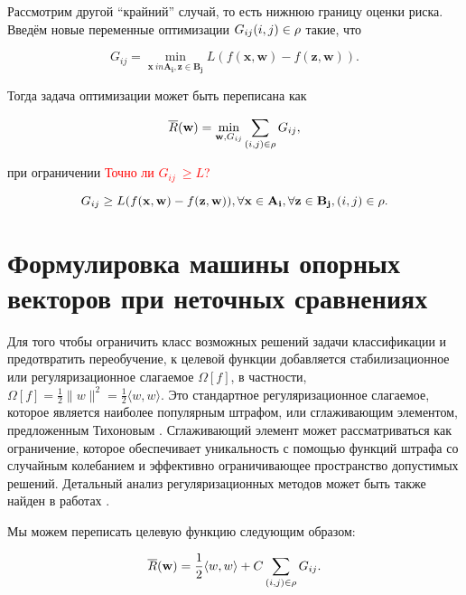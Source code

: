 \documentclass[12pt,a4paper,oneside]{article}
\begin{document}
\par
Рассмотрим другой ``крайний'' случай, то есть нижнюю границу оценки риска. 
Введём новые переменные оптимизации \(G_{ij} (i, j) \in \mathrm{\rho}\) такие, что

\[
G_{ij} = \underset{\mathbf{x} \ in \mathbf{A_i}, \mathbf{z} \in \mathbf{B_j}}{\operatorname{min}} L ( f(\mathbf{x}, \mathbf{w}) - f(\mathbf{z}, \mathbf{w})). 
\]

\par
Тогда задача оптимизации может быть переписана как

\[
\overline{R}(\mathbf{w}) = \underset{\mathbf{w}, G_{ij}}{\operatorname{min}} \sum \limits_{(i, j) \in \mathrm{\rho}} G_{ij},
\]

\par
при ограничении \textcolor{red}{Точно ли \(G_{ij}\ \geq L\)?}

\[
G_{ij} \geq L ( f(\mathbf{x}, \mathbf{w}) - f(\mathbf{z}, \mathbf{w})), \forall \mathbf{x} \in \mathbf{A_i}, \forall \mathbf{z} \in \mathbf{B_j}, (i, j) \in \mathrm{\rho}.
\]


\section{Формулировка машины опорных векторов при неточных сравнениях}
\label{sec:svm_by_imprecise_comparisons}

\par
Для того чтобы ограничить класс возможных решений задачи классификации и предотвратить переобучение, к целевой функции добавляется стабилизационное или регуляризационное слагаемое \(\Omega[f]\), в частности, \(\Omega[f] = \frac{1}{2}\|w\|^2 = \frac{1}{2} \langle w, w \rangle \). 
Это стандартное регуляризационное слагаемое, которое является наиболее популярным штрафом, или сглаживающим элементом, предложенным Тихоновым . 
Сглаживающий элемент может рассматриваться как ограничение, которое обеспечивает уникальность с помощью функций штрафа со случайным колебанием и эффективно ограничивающее пространство допустимых решений. 
Детальный анализ регуляризационных методов может быть также найден в работах  . 

\par
Мы можем переписать целевую функцию следующим образом:

\[
\overline{R}(\mathbf{w}) = \frac{1}{2} \langle w, w \rangle + C \sum \limits_{(i, j) \in \mathrm{\rho}} G_{ij}. 
\]
\end{document}
